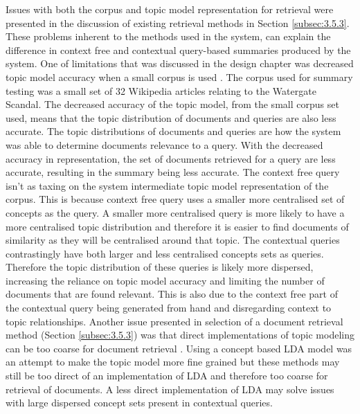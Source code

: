 Issues with both the corpus and topic model representation for retrieval were presented in the discussion of existing retrieval methods in Section \ref{subsec:3.5.3}. These problems inherent to the methods used in the system, can explain the difference in context free and contextual query-based summaries produced by the system. One of limitations that was discussed in the design chapter was decreased topic model accuracy when a small corpus is used \citep{crossley2017important}. The corpus used for summary testing was a small set of 32 Wikipedia articles relating to the Watergate Scandal. The decreased accuracy of the topic model, from the small corpus set used, means that the topic distribution of documents and queries are also less accurate. The topic distributions of documents and queries are how the system was able to determine documents relevance to a query. With the decreased accuracy in representation, the set of documents retrieved for a query are less accurate, resulting in the summary being less accurate. The context free query isn’t as taxing on the system intermediate topic model representation of the corpus. This is because context free query uses a smaller more centralised set of concepts as the query. A smaller more centralised query is more likely to have a more centralised topic distribution and therefore it is easier to find documents of similarity as they will be centralised around that topic. The contextual queries contrastingly have both larger and less centralised concepts sets as queries. Therefore the topic distribution of these queries is likely more dispersed, increasing the reliance on topic model accuracy and limiting the number of documents that are found relevant. This is also due to the context free part of the contextual query being generated from hand and disregarding context to topic relationships. Another issue presented in selection of a document retrieval method (Section \ref{subsec:3.5.3}) was that direct implementations of topic modeling can be too coarse for document retrieval \citep{wei2006lda}. Using a concept based LDA model was an attempt to make the topic model more fine grained but these methods may still be too direct of an implementation of LDA and therefore too coarse for retrieval of documents. A less direct implementation of LDA may solve issues with large dispersed concept sets present in contextual queries.

